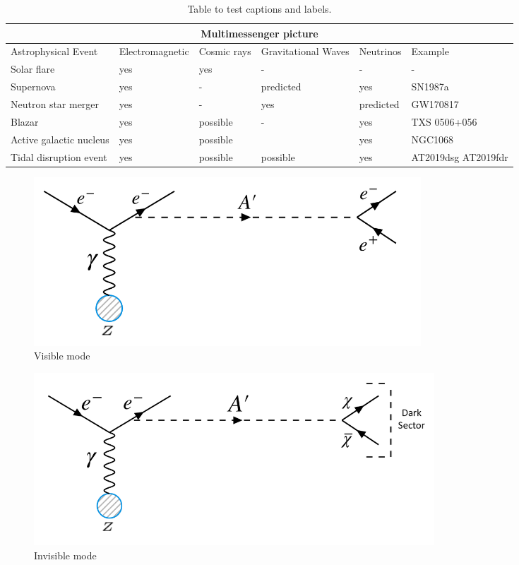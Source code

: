 \begin{table}[h!]
\centering
\begin{tabular}{ |p{4cm}||p{2.5cm}|p{1.5cm}|p{2cm}|p{1.5cm}|p{3cm}|  }
  \hline
  \multicolumn{6}{|c|}{Multimessenger picture} \\
  \hline
  Astrophysical Event& Electromagnetic &Cosmic rays&Gravitational Waves & Neutrinos & Example\\
  \hline
  Solar flare   & yes    &yes&   - & - & -\\
  Supernova & yes    &-&   predicted & yes & SN1987a\\
  Neutron star merger & yes    &-&   yes & predicted & GW170817\\
  Blazar    & yes    & possible & - & yes & TXS 0506+056\\
  Active galactic nucleus & yes    &possible&    & yes & NGC1068\\
  Tidal disruption event& yes    & possible & possible & yes & AT2019dsg  AT2019fdr \\
  \hline
\end{tabular}
\caption{Table to test captions and labels.}
\label{tab:Multimessenger}
\end{table}

\begin{figure}[t!]
\centering
\includegraphics[width=14.5cm]{thesis_figures/VISIBLE.png}
\caption{Visible mode }
\label{fig:Visible_feynman}
\end{figure}

\begin{figure}[t!]
\centering
\includegraphics[width=15cm]{thesis_figures/INVISIBLE.png}
\caption{Invisible mode }
\label{fig:Invisible_feynman}
\end{figure}


